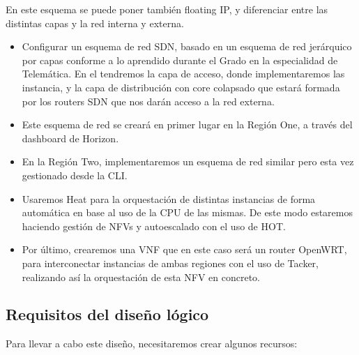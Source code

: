 \begin{tcolorbox}[colback=red!5!white,colframe=red!75!black]
En este esquema se puede poner también floating IP, y diferenciar entre las distintas capas y la red interna y externa.
\end{tcolorbox}

\begin{itemize}
\item Configurar un esquema de red SDN, basado en un esquema de red jerárquico por capas conforme a lo aprendido durante el Grado en la especialidad de Telemática. En el tendremos la capa de acceso, donde implementaremos las instancia, y la capa de distribución con core colapsado que estará formada por los routers SDN que nos darán acceso a la red externa.
\item Este esquema de red se creará en primer lugar en la Región One, a través del dashboard de Horizon.
\item En la Región Two, implementaremos un esquema de red similar pero esta vez gestionado desde la CLI.
\item Usaremos Heat para la orquestación de distintas instancias de forma automática en base al uso de la CPU de las mismas. De este modo estaremos haciendo gestión de NFVs y autoescalado con el uso de HOT.
\item Por último, crearemos una VNF que en este caso será un router OpenWRT, para interconectar instancias de ambas regiones con el uso de Tacker, realizando así la orquestación de esta NFV en concreto.
\end{itemize}

\subsection{Requisitos del diseño lógico}
Para llevar a cabo este diseño, necesitaremos crear algunos recursos:

